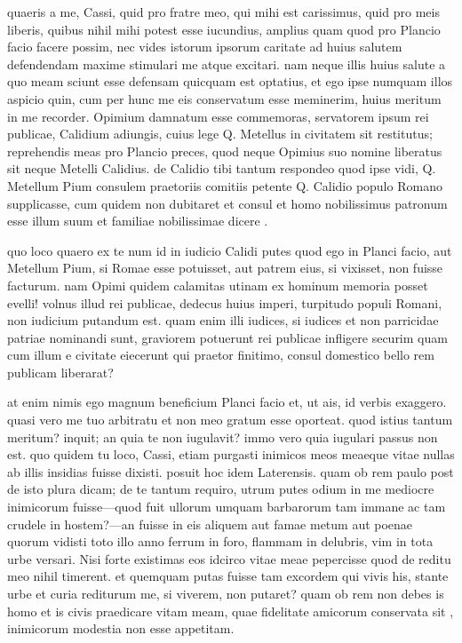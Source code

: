  quaeris a me, Cassi, quid pro fratre meo, qui mihi est carissimus, quid pro meis liberis, quibus nihil mihi potest esse iucundius, amplius quam quod pro Plancio facio facere possim, nec vides istorum ipsorum caritate ad huius salutem defendendam maxime stimulari me atque excitari. nam neque illis huius salute a quo meam sciunt esse defensam quicquam est optatius, et ego ipse numquam illos aspicio quin, cum per hunc me eis conservatum esse meminerim, huius meritum in me recorder. Opimium damnatum esse commemoras, servatorem ipsum rei publicae, Calidium adiungis, cuius lege Q. Metellus in civitatem sit restitutus; reprehendis meas pro Plancio preces, quod neque Opimius suo nomine liberatus sit neque Metelli Calidius. de Calidio tibi tantum respondeo quod ipse vidi, Q. Metellum Pium consulem praetoriis comitiis petente Q. Calidio populo Romano supplicasse, cum quidem non dubitaret et consul et homo nobilissimus patronum esse illum suum et familiae nobilissimae dicere .

 quo loco quaero ex te num id in iudicio Calidi putes quod ego in Planci facio, aut Metellum Pium, si Romae esse potuisset, aut patrem eius, si vixisset, non fuisse facturum. nam Opimi quidem calamitas utinam ex hominum memoria posset evelli! volnus illud rei publicae, dedecus huius imperi, turpitudo populi Romani, non iudicium putandum est. quam enim illi iudices, si iudices et non parricidae patriae nominandi sunt, graviorem potuerunt rei publicae infligere securim quam cum illum e civitate eiecerunt qui praetor finitimo, consul domestico bello rem publicam liberarat?

 at enim nimis ego magnum beneficium Planci facio et, ut ais, id verbis exaggero. quasi vero me tuo arbitratu et non meo gratum esse oporteat. quod istius tantum meritum? inquit; an quia te non iugulavit? immo vero quia iugulari passus non est. quo quidem tu loco, Cassi, etiam purgasti inimicos meos meaeque vitae nullas ab illis insidias fuisse dixisti. posuit hoc idem Laterensis. quam ob rem paulo post de isto plura dicam; de te tantum requiro, utrum putes odium in me mediocre inimicorum fuisse—quod fuit ullorum umquam barbarorum tam immane ac tam crudele in hostem?—an fuisse in eis aliquem aut famae metum aut poenae quorum vidisti toto illo anno ferrum in foro, flammam in delubris, vim in tota urbe versari. Nisi forte existimas eos idcirco vitae meae pepercisse quod de reditu meo nihil timerent. et quemquam putas fuisse tam excordem qui vivis his, stante urbe et curia rediturum me, si viverem, non putaret? quam ob rem non debes is homo et is civis praedicare vitam meam, quae fidelitate amicorum conservata sit , inimicorum modestia non esse appetitam.

